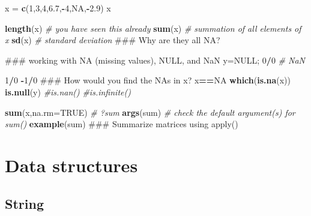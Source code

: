 \documentclass[12pt,]{book}
\newenvironment{Shaded}{\begin{snugshade}}{\end{snugshade}}
\newcommand{\KeywordTok}[1]{\textcolor[rgb]{0.13,0.29,0.53}{\textbf{#1}}}
\newcommand{\DataTypeTok}[1]{\textcolor[rgb]{0.13,0.29,0.53}{#1}}
\newcommand{\DecValTok}[1]{\textcolor[rgb]{0.00,0.00,0.81}{#1}}
\newcommand{\FloatTok}[1]{\textcolor[rgb]{0.00,0.00,0.81}{#1}}
\newcommand{\StringTok}[1]{\textcolor[rgb]{0.31,0.60,0.02}{#1}}
\newcommand{\CommentTok}[1]{\textcolor[rgb]{0.56,0.35,0.01}{\textit{#1}}}
\newcommand{\OtherTok}[1]{\textcolor[rgb]{0.56,0.35,0.01}{#1}}
\newcommand{\OperatorTok}[1]{\textcolor[rgb]{0.81,0.36,0.00}{\textbf{#1}}}
\newcommand{\NormalTok}[1]{#1}
\begin{document}
\begin{Shaded}
\begin{Highlighting}[]
\NormalTok{x =}\StringTok{ }\KeywordTok{c}\NormalTok{(}\DecValTok{1}\NormalTok{,}\DecValTok{3}\NormalTok{,}\DecValTok{4}\NormalTok{,}\FloatTok{6.7}\NormalTok{,}\OperatorTok{-}\DecValTok{4}\NormalTok{,}\OtherTok{NA}\NormalTok{,}\OperatorTok{-}\FloatTok{2.9}\NormalTok{)}
\NormalTok{x}

\KeywordTok{length}\NormalTok{(x) }\CommentTok{# you have seen this already}
\KeywordTok{sum}\NormalTok{(x) }\CommentTok{# summation of all elements of x}
\KeywordTok{sd}\NormalTok{(x) }\CommentTok{# standard deviation}
\NormalTok{### Why are they all NA?}

\NormalTok{### working with NA (missing values), NULL, and NaN}
\NormalTok{y=}\OtherTok{NULL}\NormalTok{;}
\DecValTok{0}\OperatorTok{/}\DecValTok{0} \CommentTok{# NaN}

\DecValTok{1}\OperatorTok{/}\DecValTok{0}
\OperatorTok{-}\DecValTok{1}\OperatorTok{/}\DecValTok{0}
\NormalTok{### How would you find the NAs in x?}
\NormalTok{x}\OperatorTok{==}\OtherTok{NA}
\KeywordTok{which}\NormalTok{(}\KeywordTok{is.na}\NormalTok{(x))}
\KeywordTok{is.null}\NormalTok{(y)}
\CommentTok{#is.nan()}
\CommentTok{#is.infinite()}


\KeywordTok{sum}\NormalTok{(x,}\DataTypeTok{na.rm=}\OtherTok{TRUE}\NormalTok{)}
\CommentTok{# ?sum}
\KeywordTok{args}\NormalTok{(sum) }\CommentTok{# check the default argument(s) for sum()}
\KeywordTok{example}\NormalTok{(sum)}
\NormalTok{### Summarize  matrices using apply()}
\end{Highlighting}
\end{Shaded}

\section{Data structures}\label{data-structures}

\subsection{String}\label{string}
\end{document}
